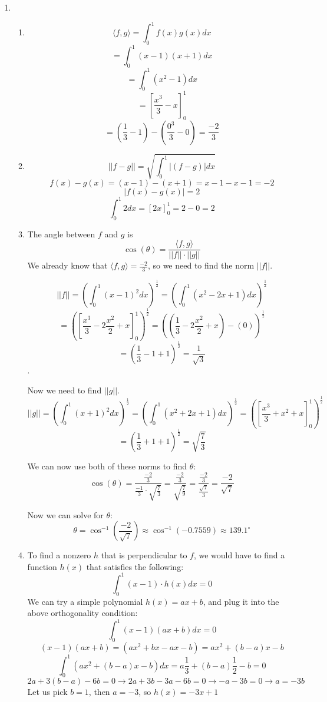 \documentclass[12pt]{article}
\begin{document}
\begin{enumerate}[leftmargin=0em]
  \item
  \begin{enumerate}[leftmargin=!]
    \item
    \[ \langle f, g \rangle = \int_{0}^{1}f(x)g(x)dx\]
    \[ = \int_{0}^{1}(x-1)(x+1)dx\]
    \[ = \int_{0}^{1}(x^2-1)dx\]
    \[ = [\frac{x^3}{3} - x]^{1}_0\]
    \[ = (\frac{1}{3} - 1) - (\frac{0^3}{3} - 0) = \frac{-2}{3}\]
    \item
    \[ || f - g || = \sqrt{\int_{0}^{1}|(f-g)|dx}\]
    \[ f(x) - g(x) = (x-1) - (x+1) = x - 1 - x - 1 = -2\]
    \[ |f(x) - g(x)| = 2\]
    \[ \int_{0}^{1}2dx = [2x]^{1}_0 = 2 - 0 = 2\]
    \item
    The angle between $f$ and $g$ is
    \[ \cos(\theta) = \frac{\langle f, g \rangle}{||f|| \cdot ||g||}\]
    We already know that $\langle f, g \rangle = \frac{-2}{3}$, so we need to find the norm $||f||$.

    \[||f|| = (\int_{0}^{1}(x-1)^2dx)^{\frac{1}{2}} = (\int_{0}^{1}(x^2-2x+1)dx)^{\frac{1}{2}}\]
    \[ = ([\frac{x^3}{3}-2\frac{x^2}{2} + x]^1_0)^\frac{1}{2} = ((\frac{1}{3} - 2\frac{x^2}{2} + x) - (0))^\frac{1}{2}\]
    \[ = (\frac{1}{3} - 1 +1)^{\frac{1}{2}} = \frac{1}{\sqrt{3}}\].

    Now we need to find $||g||$.
    \[ ||g|| = (\int_{0}^{1}(x+1)^2dx)^{\frac{1}{2}} = (\int_{0}^{1}(x^2+2x+1)dx)^{\frac{1}{2}} = ([\frac{x^3}{3} + x^{2} + x]^{1}_0)^{\frac{1}{2}}\]
    \[ = (\frac{1}{3} + 1 + 1)^\frac{1}{2} = \sqrt{\frac{7}{3}}\]

    We can now use both of these norms to find $\theta$:
    \[ \cos(\theta) = \frac{\frac{-2}{3}}{\frac{-1}{3} \cdot \sqrt{\frac{7}{3}}} = \frac{\frac{-2}{3}}{\sqrt{\frac{7}{9}}} = \frac{\frac{-2}{3}}{\frac{\sqrt{7}}{3}} = \frac{-2}{\sqrt{7}}\]

    Now we can solve for $\theta$:
    \[\theta = \cos^{-1}(\frac{-2}{\sqrt{7}}) \approx \cos^{-1}(-0.7559) \approx 139.1^{\circ}\]
    \item
    To find a nonzero $h$ that is perpendicular to $f$, we would have to find a function $h(x)$ that satisfies the following:
    \[ \int_{0}^{1}(x-1) \cdot h(x) dx = 0\]
    We can try a simple polynomial $h(x) = ax + b$, and plug it into the above orthogonality condition:
    \[\int_{0}^{1}(x-1)(ax+b)dx = 0\]
    \[(x-1)(ax+b) = (ax^2+bx -ax - b) = ax^2 + (b-a)x - b\]
    \[\int_{0}^{1}(ax^2+(b-a)x-b)dx = a\frac{1}{3}+(b-a)\frac{1}{2}-b = 0\]
    \[2a+3(b-a) - 6b = 0 \rightarrow 2a+3b-3a-6b = 0 \rightarrow -a -3b = 0 \rightarrow a = -3b\]
    Let us pick $b=1$, then $a = -3$, so $h(x) = -3x+1$
  \end{enumerate}


\end{enumerate}
\end{document}

